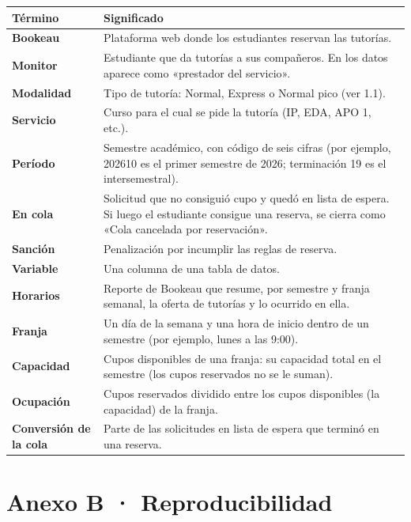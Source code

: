 \documentclass[11pt,letterpaper]{article}
\begin{document}
\begingroup\small\setlength{\tabcolsep}{4pt}\renewcommand{\arraystretch}{1.15}
\begin{longtable}{>{\raggedright\arraybackslash}p{}>{\raggedright\arraybackslash}p{}}
\toprule
\textbf{Término} & \textbf{Significado} \\
\midrule
\endhead
\textbf{Bookeau} & Plataforma web donde los estudiantes reservan las tutorías. \\
\textbf{Monitor} & Estudiante que da tutorías a sus compañeros. En los datos aparece como «prestador del servicio». \\
\textbf{Modalidad} & Tipo de tutoría: Normal, Express o Normal pico (ver 1.1). \\
\textbf{Servicio} & Curso para el cual se pide la tutoría (IP, EDA, APO 1, etc.). \\
\textbf{Período} & Semestre académico, con código de seis cifras (por ejemplo, 202610 es el primer semestre de 2026; terminación 19 es el intersemestral). \\
\textbf{En cola} & Solicitud que no consiguió cupo y quedó en lista de espera. Si luego el estudiante consigue una reserva, se cierra como «Cola cancelada por reservación». \\
\textbf{Sanción} & Penalización por incumplir las reglas de reserva. \\
\textbf{Variable} & Una columna de una tabla de datos. \\
\textbf{Horarios} & Reporte de Bookeau que resume, por semestre y franja semanal, la oferta de tutorías y lo ocurrido en ella. \\
\textbf{Franja} & Un día de la semana y una hora de inicio dentro de un semestre (por ejemplo, lunes a las 9:00). \\
\textbf{Capacidad} & Cupos disponibles de una franja: su capacidad total en el semestre (los cupos reservados no se le suman). \\
\textbf{Ocupación} & Cupos reservados dividido entre los cupos disponibles (la capacidad) de la franja. \\
\textbf{Conversión de la cola} & Parte de las solicitudes en lista de espera que terminó en una reserva. \\
\bottomrule
\end{longtable}
\endgroup


\section*{Anexo B · Reproducibilidad}
\end{document}

